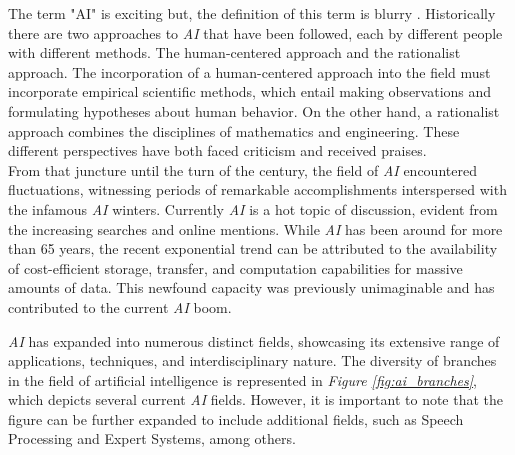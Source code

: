 The term "AI" is exciting but, the definition of this term is blurry \cite{AIModernApprouch}.
Historically there are two approaches to \textit{AI} that have been followed, each by different people
with different methods. The human-centered approach and the rationalist approach. The incorporation of a human-centered approach into the field must incorporate empirical scientific methods, which entail making observations and formulating hypotheses about human behavior. On the other hand, a rationalist approach combines the disciplines of mathematics and engineering. These different perspectives have both faced criticism and received praises. \\

From that juncture until the turn of the century, the field of \textit{AI} encountered fluctuations, witnessing periods of remarkable accomplishments interspersed with the infamous \textit{AI} winters. Currently \textit{AI} is a hot topic of discussion, evident from the increasing searches and online mentions. While \textit{AI} has been around for more than 65 years, the recent exponential trend can be attributed to the availability of cost-efficient storage, transfer, and computation capabilities for massive amounts of data. This newfound capacity was previously unimaginable and has contributed to the current \textit{AI} boom. \\

\newpage

\textit{AI} has expanded into numerous distinct fields, showcasing its extensive range of applications, techniques, and interdisciplinary nature. The diversity of branches in the field of artificial intelligence is represented in \textit{Figure \ref{fig:ai_branches}}, which depicts several current \textit{AI} fields. However, it is important to note that the figure can be further expanded to include additional fields, such as Speech Processing and Expert Systems, among others.

